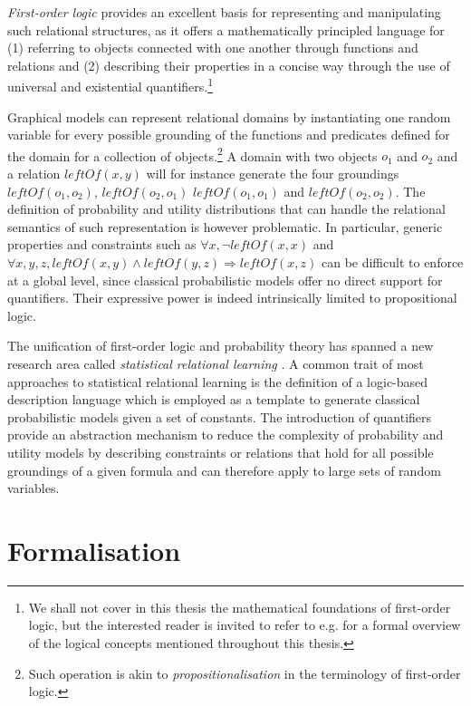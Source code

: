 \textit{First-order logic} provides an excellent basis for representing and manipulating such relational structures, as it offers a mathematically principled language for (1) referring to objects connected with one another through functions and relations and (2) describing their properties in a concise way through the use of universal and existential quantifiers.\footnote{We shall not cover in this thesis the mathematical foundations of first-order logic, but the interested reader is invited to refer to e.g. \cite{gamut1991logic} for a formal overview of the logical concepts mentioned throughout this thesis.}

Graphical models can represent relational domains by instantiating one random variable for every possible grounding of the functions and predicates defined for the domain for a collection of objects.\footnote{Such operation is akin to \textit{propositionalisation} in the terminology of first-order logic.}  A domain with two objects $o_1$ and $o_2$ and a relation $\mathit{leftOf}(x,y)$ will for instance generate the four groundings $\mathit{leftOf}(o_1,o_2)$, $\mathit{leftOf}(o_2,o_1)$ $\mathit{leftOf}(o_1,o_1)$ and $\mathit{leftOf}(o_2,o_2)$. The definition of probability and utility distributions that can handle the relational semantics of such representation is however problematic. In particular, generic properties and constraints such as $\forall x, \neg \mathit{leftOf}(x,x)$ and $\forall x, y, z, \mathit{leftOf}(x,y) \land \mathit{leftOf}(y,z) \Rightarrow \mathit{leftOf}(x,z)$ can be difficult to enforce at a global level, since classical probabilistic models offer no direct support for quantifiers.  Their expressive power is indeed intrinsically limited to propositional logic. 
 
The unification of first-order logic and probability theory has spanned a new research area called \textit{statistical relational learning} \citep{getoor:srlbook07}. A common trait of most approaches to statistical relational learning is the definition of a logic-based description language which is employed as a template to generate classical probabilistic models given a set of constants. The introduction of quantifiers provide an abstraction mechanism to reduce the complexity of probability and utility models by describing constraints or relations that hold for all possible groundings of a given formula and can therefore apply to large sets of random variables. 

\section{Formalisation}
\label{sec:formalisation}

